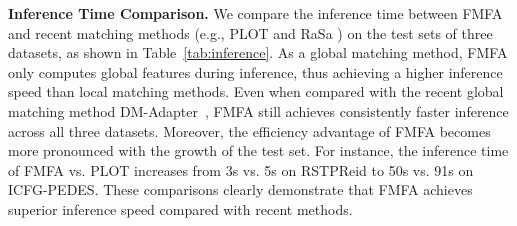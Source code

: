 \documentclass[acmsmall]{acmart}
\begin{document}
{\bfseries Inference Time Comparison.} We compare the inference time
between FMFA and recent matching methods (e.g., PLOT
\cite{park2024plot} and RaSa \cite{bai2023rasa}) on the test sets of
three datasets, as shown in Table~\ref{tab:inference}. As a global
matching method, FMFA only computes global features during
inference, thus achieving a higher inference speed than local
matching methods. Even when compared with the recent global matching
method DM-Adapter~\cite{liu2025dm}, FMFA still achieves consistently
faster inference across all three datasets. Moreover, the efficiency
advantage of FMFA becomes more pronounced with the growth of the
test set. For instance, the inference time of FMFA vs. PLOT
increases from 3s vs. 5s on RSTPReid to 50s vs. 91s on ICFG-PEDES.
These comparisons clearly demonstrate that FMFA achieves superior
inference speed compared with recent methods.

\begin{table}[t] \footnotesize
    \centering
    \caption{Comparison of the inference time (s) between FMFA and recent methods.}
    \label{tab:inference}
\end{table}
\end{document}
